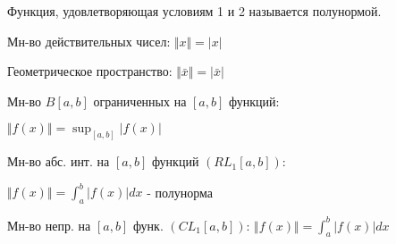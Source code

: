\documentclass{article}
\begin{document}
\begin{definition}
  Функция, удовлетворяющая условиям 1 и 2 называется полунормой.
\end{definition}
\begin{eg}
  Мн-во действительных чисел: $\Vert x \Vert=|x|$
\end{eg}
\begin{eg}
  Геометрическое пространство: $\Vert \bar{x} \Vert=|\bar{x}|$
\end{eg}
\begin{eg}
  Мн-во $B[a,b]$ ограниченных на $[a,b]$ функций: 

  $\Vert f(x) \Vert=\sup_{[a,b]}|f(x)|$
\end{eg}
\begin{eg}
  Мн-во абс. инт. на $[a,b]$ функций $(RL_1[a,b])$: 

  $\Vert f(x) \Vert=\int_{a}^{b}|f(x)|dx$ - полунорма
\end{eg}
\begin{eg}
  Мн-во непр. на $[a,b]$ функ. $(CL_1[a,b])$: $\Vert f(x) \Vert=\int_{a}^{b}|f(x)|dx$
\end{eg}
\end{document}
